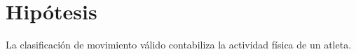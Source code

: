 \section{Hip\'otesis}
La clasificaci\'on de movimiento v\'alido contabiliza la actividad f\'isica de un atleta.